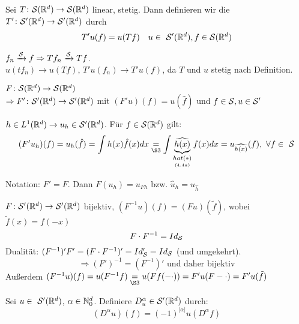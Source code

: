 \begin{definition}  
	Sei $T \colon \mathcal{S}(\mathbb{R}^{d}) \rightarrow \mathcal{S}(\mathbb{R}^{d})$ linear, stetig. Dann definieren wir die  $T' \colon \mathcal{S}'(\mathbb{R}^{d}) \rightarrow \mathcal{S}'(\mathbb{R}^{d})$ durch
		\[  T' u(f) = u(Tf) \quad u \in \Sz'(\R^{d}), f \in \Sz(\R^{d}) \]
\end{definition}

\begin{beweis}
	$f_{n} \xrightarrow[]{\mathcal{S}} f \Rightarrow T f_{n} \xrightarrow[]{\mathcal{S}} T f$.  \\
	$u(tf_{n}) \rightarrow u(Tf)$, $T'u(f_{n}) \rightarrow T'u(f)$, da $T$ und $u$ stetig nach Definition.
\end{beweis}


\begin{definition} \label{def:4.6}
	$F \colon \mathcal{S}(\mathbb{R}^{d}) \rightarrow \mathcal{S}(\mathbb{R}^{d})$ \\
	$\Rightarrow F' \colon \mathcal{S}'(\mathbb{R}^{d}) \rightarrow \mathcal{S}'(\mathbb{R}^{d})$ mit $(F'u)(f) = u(\hat{f})$ und $f \in \mathcal{S}, u \in \mathcal{S}'$
\end{definition}


\begin{bemerkung}
	$h \in L^{1}(\mathbb{R}^{d}) \rightarrow u_{h} \in \mathcal{S}'(\mathbb{R}^{d})$. Für $f \in \mathcal{S}(\mathbb{R}^{d})$ gilt:
	\[ (F' u_{h})(f) = u_{h}(\hat{f}) = \int h(x) \hat{f}(x) dx \underset{\S 3}{=} \int \underbrace{\widehat{h(x)}}_{\underset{(4.4 a)}{hat (*)}} f(x) dx = u_{\widehat{h(x)}}(f), ~\forall f \in \Sz \]
\end{bemerkung} 


Notation: $F' = F$. Dann $\boxed{F(u_{h}) = u_{Fh} \text{ bzw. } \hat{u}_{h} = u_{\hat{h}}}$


\begin{prop} %
	$F \colon \mathcal{S}'(\mathbb{R}^{d}) \rightarrow \mathcal{S}'(\mathbb{R}^{d})$ bijektiv, $(F^{-1}u)(f) = (Fu)(\tilde{f})$, wobei $\tilde{f}(x) = f(-x)$ \\
		\[ F \cdot F^{-1} = Id_{\mathcal{S}} \]
	Dualität: $(F^{-1})' F' = (F \cdot F^{-1})' = Id_{\mathcal{S}}' = Id_{\mathcal{S}}$ (und umgekehrt).
		\[ \Rightarrow (F')^{-1} = (F^{-1})' \text{ und daher bijektiv} \]
		Au{\ss}erdem $(F^{-1}u)(f) = u(F^{-1}f) \underset{\S 3}{=} u(Ff(-\cdot)) = F' u (F-\cdot) = F'u(\tilde{f})$
\end{prop}
 

\begin{definition}
	Sei $u \in \Sz'(\R^{d})$, $\alpha \in \mathbb{N}_{0}^{d}$. Definiere $D_{u}^{\alpha} \in \mathcal{S}'(\mathbb{R}^{d})$ durch:
	\[ (D^{\alpha}u)(f) = (-1)^{|\alpha|} u(D^{\alpha}f) \]
\end{definition} 
 

